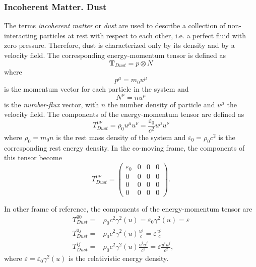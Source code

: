 \subsubsection{Incoherent Matter. Dust}
The terms \textit{incoherent matter} or \textit{dust} are used to describe a collection of non-interacting particles at rest with respect to each
other, i.e. a perfect fluid with zero pressure. Therefore, dust is characterized only by its density and by a velocity field. The corresponding energy-momentum tensor is defined as
\begin{equation}
\mathbf{T}_{Dust}=p \otimes N
\end{equation}
where
\begin{equation}
p^\mu = m_{0} u^\mu
\end{equation}
is the momentum vector for each particle in the system and
\begin{equation}
N^\mu = n u^\mu
\end{equation}
is the \textit{number-flux} vector, with $n$ the number density of particle and $u^\mu$ the velocity field. The components of the energy-momentum tensor are defined as 
\begin{equation}
T_{Dust}^{\mu\nu}=\rho_{0} u^{\mu}u^{\nu} =\frac{\varepsilon_{0}}{c^{2}}u^{\mu}u^{\nu} \label{eq:DustEnergyMomentumTensor}
\end{equation}
where $\rho_0 = m_0 n$ is the rest mass density of the system and $\varepsilon_0 = \rho_0 c^2$ is the corresponding rest energy density. In the co-moving frame, the components of this tensor become
\begin{equation}
T^{\mu\nu} _{Dust} =\left(\begin{array}{cccc}
\varepsilon_{0} & 0 & 0 & 0\\
0 & 0 & 0 & 0\\
0 & 0 & 0 & 0\\
0 & 0 & 0 & 0
\end{array}\right).
\end{equation}

In other frame of reference, the components of the energy-momentum tensor are
\begin{subequations}
\begin{align}
T_{Dust}^{00} = &\rho_0 c^2 \gamma^2 (u) = \varepsilon_0 \gamma^2 (u)  = \varepsilon \\
T_{Dust}^{0j} = &\rho_0 c^2 \gamma^2 (u) \frac{u^j}{c}= \varepsilon \frac{u^j}{c}  \\
T_{Dust}^{ij} = & \rho_0 c^2 \gamma^2 (u) \frac{u^i u^j}{c^2}= \varepsilon \frac{u^i u^j}{c^2},
\end{align}
\end{subequations}
where $\varepsilon = \varepsilon_0 \gamma^2 (u)$ is the relativistic energy density.

